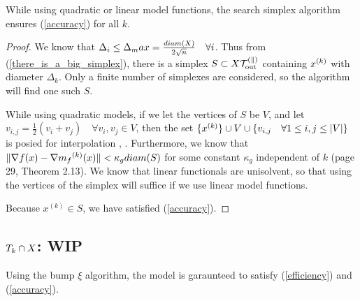 \documentclass{article}
\let\oldref\ref
\renewcommand{\ref}[1]{(\oldref{#1})}
\begin{document}
\begin{lemma}
While using quadratic or linear model functions, the search simplex algorithm ensures \ref{accuracy} for all $k$.
\end{lemma}
\begin{proof}


We know that $\Delta_i \le \Delta_max = \frac {diam(X)}{2\sqrt{n}} \quad \forall i$.
Thus from \ref{there_is_a_big_simplex}, there is a simplex $S \subset X \cal {T_{\text{out}}^{(k)}} $ containing ${x}^{(k)}$ with diameter $\Delta_k$.
Only a finite number of simplexes are considered, so the algorithm will find one such $S$.

While using quadratic models, if we let the vertices of $S$ be $V$, and let $v_{i,j} = \frac 1 2 (v_i + v_j) \quad \forall v_i, v_j \in V$, then the set
$\{{x}^{(k)}\} \cup V \cup \{v_{i,j} \quad \forall 1\le i, j \le |V|\}$ is posied for interpolation \cite{Ciarlet1971}, \cite{Ciarlet1972}.
Furthermore, we know that $\|\nabla f(x) - \nabla {{m}_f}^{(k)}(x)\| < \kappa_{g} diam(S)$ for some constant $\kappa_{g}$ independent of $k$ \cite{DUMMY:intro_book} (page 29, Theorem 2.13).
We know that linear functionals are unisolvent, so that using the vertices of the simplex will suffice if we use linear model functions.

Because $x^{(k)} \in S$, we have satisfied \ref{accuracy}.

\end{proof}







\subsection{$T_k \cap X$: WIP}
\begin{lemma}
Using the bump $\xi$ algorithm, the model is garaunteed to satisfy \ref{efficiency} and \ref{accuracy}.
\end{lemma}
\end{document}
